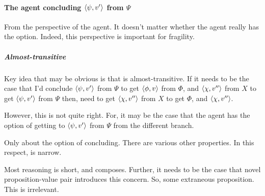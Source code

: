 \paragraph*{The agent concluding \(\langle \psi, v' \rangle\) from \(\Psi\)}

\begin{note}
  From the perspective of the agent.
  It doesn't matter whether the agent really has the option.
  Indeed, this perspective is important for fragility.
\end{note}

\subparagraph*{Almost-transitive}

\begin{note}
  Key idea that may be obvious is that \csN{} is almost-transitive.
  If it needs to be the case that I'd conclude \(\langle \psi, v' \rangle\) from \(\Psi\) to get \(\langle \phi, v \rangle\) from \(\Phi\), and \(\langle \chi, v'' \rangle\) from \(X\) to get \(\langle \psi, v' \rangle\) from \(\Psi\) then, need to get \(\langle \chi, v'' \rangle\) from \(X\) to get \(\Phi\), and \(\langle \chi, v'' \rangle\).

  However, this is not quite right.
  For, it may be the case that the agent has the option of getting to \(\langle \psi, v' \rangle\) from \(\Psi\) from the different branch.
\end{note}

\begin{note}
  Only about the option of concluding.
  There are various other properties.
  In this respect, \qzS{} is narrow.
\end{note}

\begin{note}
  Most reasoning is short, and composes.
  Further, it needs to be the case that novel proposition-value pair introduces this concern.
  So, some extraneous proposition.
  This is irrelevant.
\end{note}

